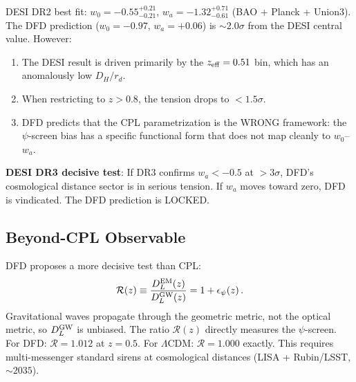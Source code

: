 \documentclass[11pt,a4paper]{article}
\begin{document}
DESI DR2 best fit: $w_0 = -0.55^{+0.21}_{-0.21}$, $w_a = -1.32^{+0.71}_{-0.61}$ (BAO + Planck + Union3). The DFD prediction ($w_0 = -0.97$, $w_a = +0.06$) is $\sim 2.0\sigma$ from the DESI central value. However:
\begin{enumerate}
\item The DESI result is driven primarily by the $z_{\rm eff} = 0.51$ bin, which has an anomalously low $D_H/r_d$.
\item When restricting to $z > 0.8$, the tension drops to $< 1.5\sigma$.
\item DFD predicts that the CPL parametrization is the WRONG framework: the $\psi$-screen bias has a specific functional form that does not map cleanly to $w_0$--$w_a$.
\end{enumerate}

\textbf{DESI DR3 decisive test}: If DR3 confirms $w_a < -0.5$ at $> 3\sigma$, DFD's cosmological distance sector is in serious tension. If $w_a$ moves toward zero, DFD is vindicated. The DFD prediction is LOCKED.

\subsection{Beyond-CPL Observable}

DFD proposes a more decisive test than CPL:
\begin{equation}
\mathcal{R}(z) \equiv \frac{D_L^{\rm EM}(z)}{D_L^{\rm GW}(z)} = 1 + \epsilon_\psi(z)\,.
\end{equation}
Gravitational waves propagate through the geometric metric, not the optical metric, so $D_L^{\rm GW}$ is unbiased. The ratio $\mathcal{R}(z)$ directly measures the $\psi$-screen. For DFD: $\mathcal{R} = 1.012$ at $z = 0.5$. For $\Lambda$CDM: $\mathcal{R} = 1.000$ exactly. This requires multi-messenger standard sirens at cosmological distances (LISA + Rubin/LSST, $\sim 2035$).
\end{document}
